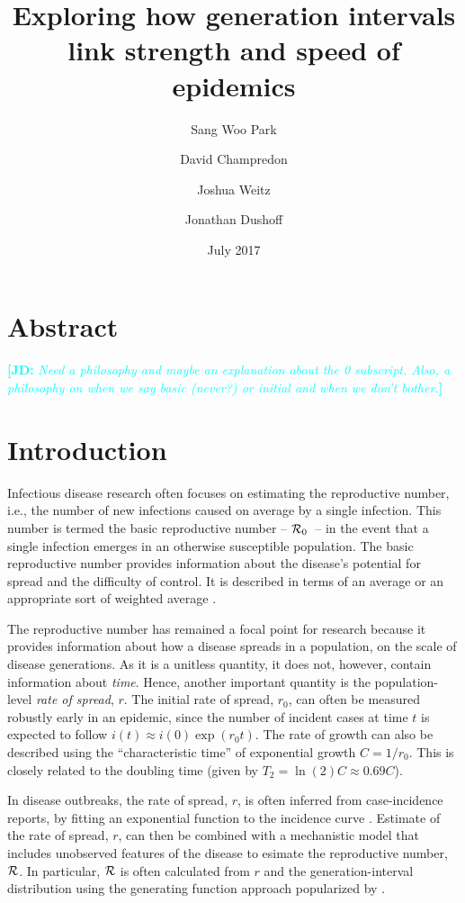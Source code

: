 \documentclass[12pt,]{article}
\title{Exploring how generation intervals link strength and speed of epidemics}
\author{Sang Woo Park \and David Champredon \and Joshua Weitz \and Jonathan Dushoff}
\date{July 2017}
\newcommand{\RR}{\ensuremath{{\cal R}}}
\newcommand{\Rx}[1]{\ensuremath{{\cal R}_{#1}}}
\newcommand{\Ro}{\Rx{0}}
\newcommand{\Tc}{\ensuremath{C}}
\newcommand{\comment}[3]{\textcolor{#1}{\textbf{[#2: }\textit{#3}\textbf{]}}}
\newcommand{\jd}[1]{\comment{cyan}{JD}{#1}}
\begin{document}
\maketitle

\section*{Abstract}

\jd{Need a philosophy and maybe an explanation about the 0 subscript. Also, a philosophy on when we say basic (never?) or initial and when we don't bother.}

\section{Introduction}

Infectious disease research often focuses on estimating the reproductive number, i.e., the number of new infections caused on average by a single infection.
This number is termed the basic reproductive number -- \Ro\ -- in the event that a single infection emerges in an otherwise susceptible population.
The basic reproductive number provides information about the disease's potential for spread and the difficulty of control.
It is described in terms of an average \cite{AndeMay91} or an appropriate sort of weighted average \cite{DiekHees90}.

The reproductive number has remained a focal point for research because it provides information about how a disease spreads in a population, on the scale of disease generations.
As it is a unitless quantity, it does not, however, contain information about \emph{time}.
Hence, another important quantity is the population-level \emph{rate of spread}, $r$. The initial rate of spread, $r_0$, can often be measured robustly early in an epidemic, since the number of incident cases at time $t$ is expected to follow $i(t) \approx i(0) \exp(r_0t)$. The rate of growth can also be described using the ``characteristic time'' of exponential growth $\Tc = 1/r_0$. This is closely related to the doubling time (given by $T_2 = \ln(2) \Tc \approx 0.69 \Tc$).

In disease outbreaks, the rate of spread, $r$, is often inferred from case-incidence reports, by fitting an exponential function to the incidence curve \cite{MillRobi04, NishCast09, MaJDush14}.
Estimate of the rate of spread, $r$, can then be combined with a mechanistic model that includes unobserved features of the disease to esimate the reproductive number, \RR.
In particular, $\RR$ is often calculated from $r$ and the generation-interval distribution using the generating function approach popularized by \cite{WallLips07}.
\end{document}
